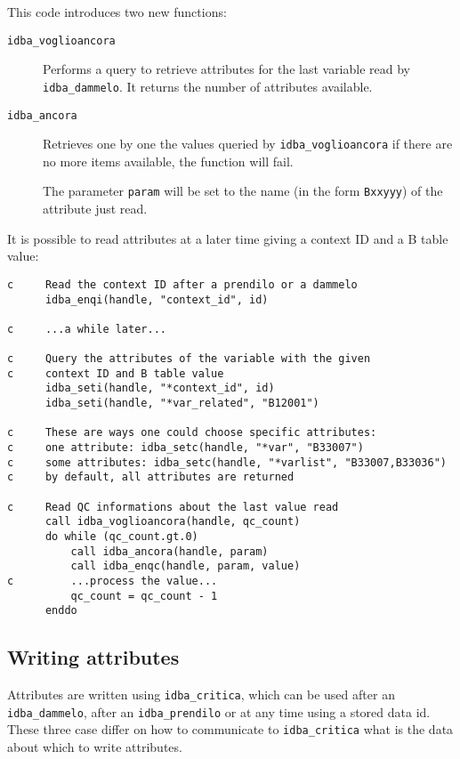 \documentclass[final,12pt,a4paper,twoside]{book}
\begin{document}
This code introduces two new functions:

\begin{description}
\item[{\tt idba\_voglioancora}]
  Performs a query to retrieve attributes for the last variable read by
  {\tt idba\_dammelo}.  It returns the number of attributes available.
\item[{\tt idba\_ancora}]
  Retrieves one by one the values queried by {\tt idba\_voglioancora} if
  there are no more items available, the function will fail.

  The parameter {\tt param} will be set to the name (in the form {\tt *Bxxyyy}) of
  the attribute just read.
\end{description}

It is possible to read attributes at a later time giving a context ID and a B
table value:

\begin{verbatim}
c     Read the context ID after a prendilo or a dammelo
      idba_enqi(handle, "context_id", id)

c     ...a while later...

c     Query the attributes of the variable with the given
c     context ID and B table value
      idba_seti(handle, "*context_id", id)
      idba_seti(handle, "*var_related", "B12001")

c     These are ways one could choose specific attributes:
c     one attribute: idba_setc(handle, "*var", "B33007")
c     some attributes: idba_setc(handle, "*varlist", "B33007,B33036")
c     by default, all attributes are returned

c     Read QC informations about the last value read
      call idba_voglioancora(handle, qc_count)
      do while (qc_count.gt.0)
          call idba_ancora(handle, param) 
          call idba_enqc(handle, param, value)
c         ...process the value...
          qc_count = qc_count - 1
      enddo
\end{verbatim}

\subsection{Writing attributes}

\label{fun-idba_critica}

Attributes are written using {\tt idba\_critica}, which can be used after an
{\tt idba\_dammelo}, after an {\tt idba\_prendilo} or at any time using a stored data
id.  These three case differ on how to communicate to {\tt idba\_critica} what is
the data about which to write attributes.
\end{document}
